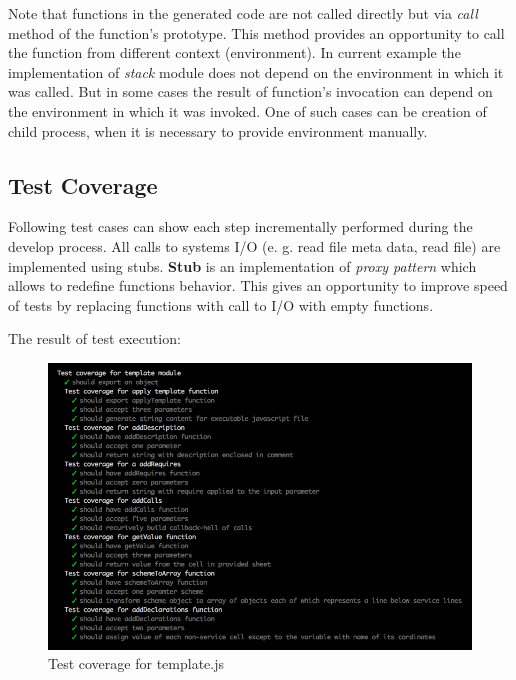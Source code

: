Note that functions in the generated code are not called directly but via \textit{call} method of the function's prototype. This method provides an opportunity to call the function from different context (environment). In current example the implementation of \textit{stack} module does not depend on the environment in which it was called. But in some cases the result of function's invocation can depend on the environment in which it was invoked. One of such cases can be creation of child process, when it is necessary to provide environment manually. 


\subsection{Test Coverage}
Following test cases can show each step incrementally performed during the develop process. All calls to systems I/O (e. g. read file meta data, read file) are implemented using stubs. \textbf{Stub} is an implementation of \textit{proxy pattern} which allows to redefine functions behavior. This gives an opportunity to improve speed of tests by replacing functions with call to I/O with empty functions.

%

The result of test execution:
\begin{figure}[H]
	\centering
	\includegraphics[width=\linewidth]{grafiken/testTemplate.png}
	\caption{Test coverage for template.js}
	\label{fig:testTemplate}
\end{figure}


